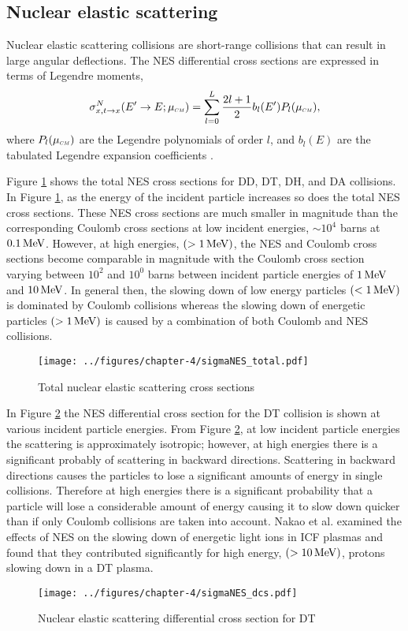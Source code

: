 \subsection{Nuclear elastic scattering}
Nuclear elastic scattering collisions are short-range collisions that can result in large angular deflections. The NES differential cross sections are expressed in terms of Legendre moments,
\begin{equation} \label{eqn:nes_differential cross section}
    \sigma_{x,t \rightarrow x}^N(E^{\prime} \rightarrow E; \mucm) = \sum_{l=0}^L \dfrac{2l+1}{2} b_l(E^{\prime}) P_l(\mucm),
\end{equation}
where $P_l(\mucm)$ are the Legendre polynomials of order $l$, and $b_l(E)$ are the tabulated Legendre expansion coefficients \cite{Brown-2018}.

Figure \ref{fig:nesTotal} shows the total NES cross sections for DD, DT, DH, and DA collisions. In Figure \ref{fig:nesTotal}, as the energy of the incident particle increases so does the total NES cross sections. These NES cross sections are much smaller in magnitude than the corresponding Coulomb cross sections at low incident energies, $\sim 10^4$ barns at $0.1 \,\text{MeV}$. However, at high energies, $(> 1 \,\text{MeV})$, the NES and Coulomb cross sections become comparable in magnitude with the Coulomb cross section varying between $10^2$ and $10^0$ barns between incident particle energies of $1 \,\text{MeV}$ and $10 \,\text{MeV}$. In general then, the slowing down of low energy particles $(< 1 \,\text{MeV})$ is dominated by Coulomb collisions whereas the slowing down of energetic particles $(> 1 \,\text{MeV})$ is caused by a combination of both Coulomb and NES collisions.

\begin{figure}[!htb]
    \centering
    \texttt{[image: ../figures/chapter-4/sigmaNES\_total.pdf]}
    \caption{Total nuclear elastic scattering cross sections}
    \label{fig:nesTotal}
\end{figure}

In Figure \ref{fig:nesDCS} the NES differential cross section for the DT collision is shown at various incident particle energies. From Figure \ref{fig:nesDCS}, at low incident particle energies the scattering is approximately isotropic; however, at high energies there is a significant probably of scattering in backward directions. Scattering in backward directions causes the particles to lose a significant amounts of energy in single collisions. Therefore at high energies there is a significant probability that a particle will lose a considerable amount of energy causing it to slow down quicker than if only Coulomb collisions are taken into account. Nakao et al. \cite{Nakao-1990} examined the effects of NES on the slowing down of energetic light ions in ICF plasmas and found that they contributed significantly for high energy, $(> 10 \,\text{MeV})$, protons slowing down in a DT plasma.

\begin{figure}[!htb]
    \centering
    \texttt{[image: ../figures/chapter-4/sigmaNES\_dcs.pdf]}
    \caption{Nuclear elastic scattering differential cross section for DT}
    \label{fig:nesDCS}
\end{figure}